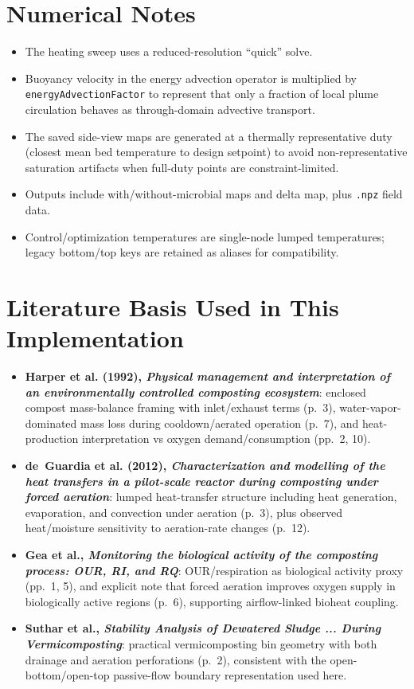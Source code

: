\documentclass[11pt]{article}
\begin{document}
\section{Numerical Notes}
\begin{itemize}
\item The heating sweep uses a reduced-resolution ``quick'' solve.
\item Buoyancy velocity in the energy advection operator is multiplied by
\texttt{energyAdvectionFactor} to represent that only a fraction of local
plume circulation behaves as through-domain advective transport.
\item The saved side-view maps are generated at a thermally representative duty
(closest mean bed temperature to design setpoint) to avoid non-representative
saturation artifacts when full-duty points are constraint-limited.
\item Outputs include with/without-microbial maps and delta map,
plus \texttt{.npz} field data.
\item Control/optimization temperatures are single-node lumped temperatures; legacy
bottom/top keys are retained as aliases for compatibility.
\end{itemize}

\section{Literature Basis Used in This Implementation}
\begin{itemize}
\item \textbf{Harper et al. (1992), \emph{Physical management and interpretation of an environmentally controlled composting ecosystem}}: enclosed compost mass-balance framing with inlet/exhaust terms (p.\ 3), water-vapor-dominated mass loss during cooldown/aerated operation (p.\ 7), and heat-production interpretation vs oxygen demand/consumption (pp.\ 2, 10).
\item \textbf{de~Guardia et al. (2012), \emph{Characterization and modelling of the heat transfers in a pilot-scale reactor during composting under forced aeration}}: lumped heat-transfer structure including heat generation, evaporation, and convection under aeration (p.\ 3), plus observed heat/moisture sensitivity to aeration-rate changes (p.\ 12).
\item \textbf{Gea et al., \emph{Monitoring the biological activity of the composting process: OUR, RI, and RQ}}: OUR/respiration as biological activity proxy (pp.\ 1, 5), and explicit note that forced aeration improves oxygen supply in biologically active regions (p.\ 6), supporting airflow-linked bioheat coupling.
\item \textbf{Suthar et al., \emph{Stability Analysis of Dewatered Sludge ... During Vermicomposting}}: practical vermicomposting bin geometry with both drainage and aeration perforations (p.\ 2), consistent with the open-bottom/open-top passive-flow boundary representation used here.
\end{itemize}
\end{document}

